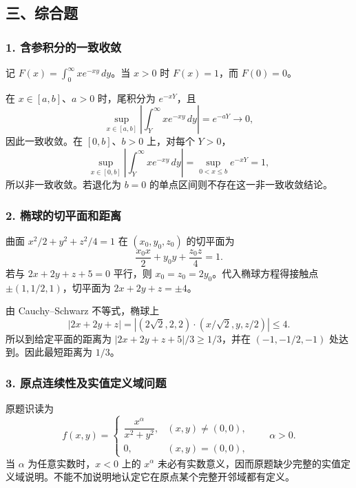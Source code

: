 \documentclass[11pt,fontset=fandol]{ctexart}
\begin{document}
\subsection{三、综合题}\label{ux4e09ux7efcux5408ux9898}

\subsubsection{1.
含参积分的一致收敛}\label{ux542bux53c2ux79efux5206ux7684ux4e00ux81f4ux6536ux655b}

记 \(F(x)=\int_0^{\infty}xe^{-xy}\,dy\)。当 \(x>0\) 时 \(F(x)=1\)，而
\(F(0)=0\)。

在 \(x\in[a,b]\)、\(a>0\) 时，尾积分为 \(e^{-xY}\)，且 \[
\sup_{x\in[a,b]}\left|\int_Y^{\infty}xe^{-xy}\,dy\right|=e^{-aY}\longrightarrow0,
\] 因此一致收敛。在 \([0,b]\)、\(b>0\) 上，对每个 \(Y>0\)， \[
\sup_{x\in[0,b]}\left|\int_Y^{\infty}xe^{-xy}\,dy\right|=\sup_{0<x\leq b}e^{-xY}=1,
\] 所以非一致收敛。若退化为 \(b=0\)
的单点区间则不存在这一非一致收敛结论。

\subsubsection{2.
椭球的切平面和距离}\label{ux692dux7403ux7684ux5207ux5e73ux9762ux548cux8dddux79bb}

曲面 \(x^2/2+y^2+z^2/4=1\) 在 \((x_0,y_0,z_0)\) 的切平面为 \[
\frac{x_0x}{2}+y_0y+\frac{z_0z}{4}=1.
\] 若与 \(2x+2y+z+5=0\) 平行，则 \(x_0=z_0=2y_0\)。代入椭球方程得接触点
\(\pm(1,1/2,1)\)，切平面为 \(\boxed{2x+2y+z=\pm4}\)。

由 Cauchy--Schwarz 不等式，椭球上 \[
|2x+2y+z|=\left|(2\sqrt2,2,2)\cdot(x/\sqrt2,y,z/2)\right|\leq4.
\] 所以到给定平面的距离为 \(|2x+2y+z+5|/3\geq1/3\)，并在
\((-1,-1/2,-1)\) 处达到。因此最短距离为 \(\boxed{1/3}\)。

\subsubsection{3.
原点连续性及实值定义域问题}\label{ux539fux70b9ux8fdeux7eedux6027ux53caux5b9eux503cux5b9aux4e49ux57dfux95eeux9898}

原题识读为 \[
f(x,y)=\begin{cases}\dfrac{x^\alpha}{x^2+y^2},&(x,y)\neq(0,0),\\0,&(x,y)=(0,0),\end{cases}\qquad\alpha>0.
\] 当 \(\alpha\) 为任意实数时，\(x<0\) 上的 \(x^\alpha\)
未必有实数意义，因而原题缺少完整的实值定义域说明。不能不加说明地认定它在原点某个完整开邻域都有定义。
\end{document}
